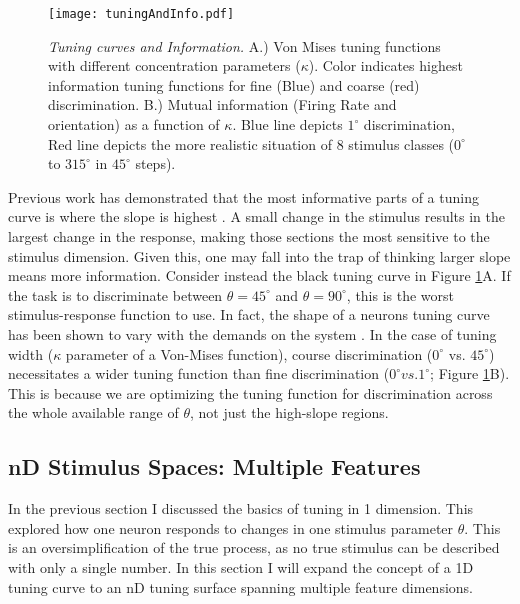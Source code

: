 \begin{figure}[h]
	\centerline{\texttt{[image: tuningAndInfo.pdf]}}
	\caption{\textit{Tuning curves and Information.} A.) Von Mises tuning functions with different concentration parameters ($\kappa$). Color indicates highest information tuning functions for fine (Blue) and coarse (red) discrimination. B.) Mutual information (Firing Rate and orientation) as a function of $\kappa$. Blue line depicts $1^\circ$ discrimination, Red line depicts the more realistic situation of 8 stimulus classes ($0^\circ$ to $315^\circ$ in $45^\circ$ steps). }
	\label{fig:tuningInfo}
\end{figure}

Previous work has demonstrated that the most informative parts of a tuning curve is where the slope is highest \parencite{Series2004}. A small change in the stimulus results in the largest change in the response, making those sections the most sensitive to the stimulus dimension. Given this, one may fall into the trap of thinking larger slope means more information. Consider instead the black tuning curve in Figure \ref{fig:tuningInfo}A. If the task is to discriminate between $\theta=45^\circ$ and $\theta=90^\circ$, this is the worst stimulus-response function to use. In fact, the shape of a neurons tuning curve has been shown to vary with the demands on the system \parencite{Scott2022}. In the case of tuning width ($\kappa$ parameter of a Von-Mises function), course discrimination ($0^\circ$ vs. $45^\circ$) necessitates a wider tuning function than fine discrimination ($0^\circ vs. 1^\circ$; Figure \ref{fig:tuningInfo}B). This is because we are optimizing the tuning function for discrimination across the whole available range of $\theta$, not just the high-slope regions. 



\subsection{nD Stimulus Spaces: Multiple Features}
In the previous section I discussed the basics of tuning in 1 dimension. This explored how one neuron responds to changes in one stimulus parameter $\theta$. This is an oversimplification of the true process, as no true stimulus can be described with only a single number. In this section I will expand the concept of a 1D tuning curve to an nD tuning surface spanning multiple feature dimensions. 

